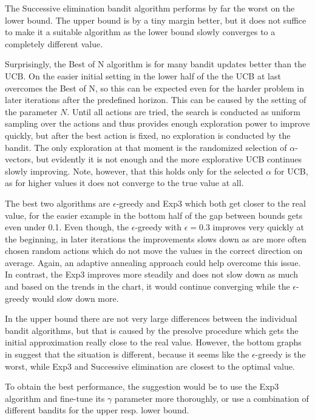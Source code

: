 \documentclass[../main.tex]{subfiles}
\begin{document}
The Successive elimination bandit algorithm performs by far the worst on the lower bound.
The upper bound is by a tiny margin better, but it does not suffice to make it a suitable algorithm as the lower bound slowly converges to a completely different value.

Surprisingly, the Best of N algorithm is for many bandit updates better than the UCB.
On the easier initial setting in the lower half of the  the UCB at last overcomes the Best of N, so this can be expected even for the harder problem in later iterations after the predefined horizon.
This can be caused by the setting of the parameter $N$.
Until all actions are tried, the search is conducted as uniform sampling over the actions and thus provides enough exploration power to improve quickly, but after the best action is fixed, no exploration is conducted by the bandit.
The only exploration at that moment is the randomized selection of $\alpha$-vectors, but evidently it is not enough and the more explorative UCB continues slowly improving.
Note, however, that this holds only for the selected $\alpha$ for UCB, as for higher values it does not converge to the true value at all.

The best two algorithms are $\epsilon$-greedy and Exp3 which both get closer to the real value, for the easier example in the bottom half of  the gap between bounds gets even under 0.1.
Even though, the $\epsilon$-greedy with $\epsilon = 0.3$ improves very quickly at the beginning, in later iterations the improvements slows down as are more often chosen random actions which do not move the values in the correct direction on average.
Again, an adaptive annealing approach could help overcome this issue.
In contrast, the Exp3 improves more steadily and does not slow down as much and based on the trends in the chart, it would continue converging while the $\epsilon$-greedy would slow down more.

In the upper bound there are not very large differences between the individual bandit algorithms, but that is caused by the presolve procedure which gets the initial approximation really close to the real value.
However, the bottom graphs in  suggest that the situation is different, because it seems like the $\epsilon$-greedy is the worst, while Exp3 and Successive elimination are closest to the optimal value.

To obtain the best performance, the suggestion would be to use the Exp3 algorithm and fine-tune its $\gamma$ parameter more thoroughly, or use a combination of different bandits for the upper resp. lower bound.
\end{document}
